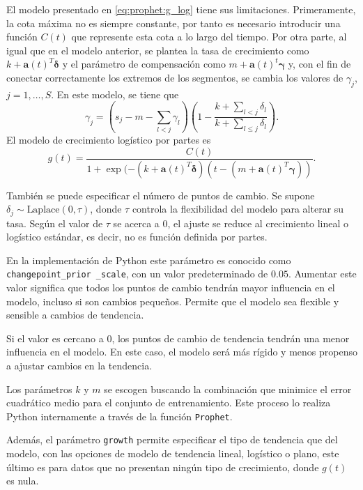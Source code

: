 \documentclass[12pt,twoside]{article}
\begin{document}
El modelo presentado en \eqref{eq:prophet:g_log} tiene sus limitaciones. Primeramente, la cota máxima no es siempre constante, por tanto es necesario introducir una función $C(t)$ que represente esta cota a lo largo del tiempo. Por otra parte, al igual que en el modelo anterior, se plantea la tasa de crecimiento como $k + \mathbf{a}(t)^T\boldsymbol{\delta}$ y el parámetro de compensación como $m + \mathbf{a}(t)^t\boldsymbol{\gamma}$ y, con el fin de conectar correctamente los extremos de los segmentos, se cambia los valores de $\gamma_j$, $j=1,\dotsc,S$. En este modelo, se tiene que 
\begin{equation}
    \gamma_j = \left(s_j-m-\sum_{l<j}\gamma_l\right)\left(1 - \frac{k+\sum_{l<j}\delta_l}{k+\sum_{l\leq j}\delta_l}\right).
\end{equation}
El modelo de crecimiento logístico por partes es 
\begin{equation}\label{eq:prophet:g_log2}
     g(t) = \frac{C(t)}{1 + \exp{(-(k+\mathbf{a}(t)^T\boldsymbol{\delta})(t-(m+\mathbf{a}(t)^T\boldsymbol{\gamma}))}}.
\end{equation}

También se puede especificar el número de puntos de cambio. Se supone $\delta_j \sim \text{Laplace}(0, \tau)$, donde $\tau$ controla la flexibilidad del modelo para alterar su tasa. Según el valor de $\tau$ se acerca a $0$, el ajuste se reduce al crecimiento lineal o logístico estándar, es decir, no es función definida por partes.

En la implementación de Python este parámetro es conocido como \texttt{changepoint\_prior \_scale}, con un valor predeterminado de $0.05$. Aumentar este valor significa que todos los puntos de cambio tendrán mayor influencia en el modelo, incluso si son cambios pequeños. Permite que el modelo sea flexible y sensible a cambios de tendencia.

Si el valor es cercano a $0$, los puntos de cambio de tendencia tendrán una menor influencia en el modelo. En este caso, el modelo será más rígido y menos propenso a ajustar cambios en la tendencia.

Los parámetros $k$ y $m$ se escogen buscando la combinación que minimice el error cuadrático medio para el conjunto de entrenamiento. Este proceso lo realiza Python internamente a través de la función \texttt{Prophet}.

Además, el parámetro \texttt{growth} permite especificar el tipo de tendencia que del modelo, con las opciones de modelo de tendencia lineal, logístico o plano, este último es para datos que no presentan ningún tipo de crecimiento, donde $g(t)$ es nula.
\end{document}
